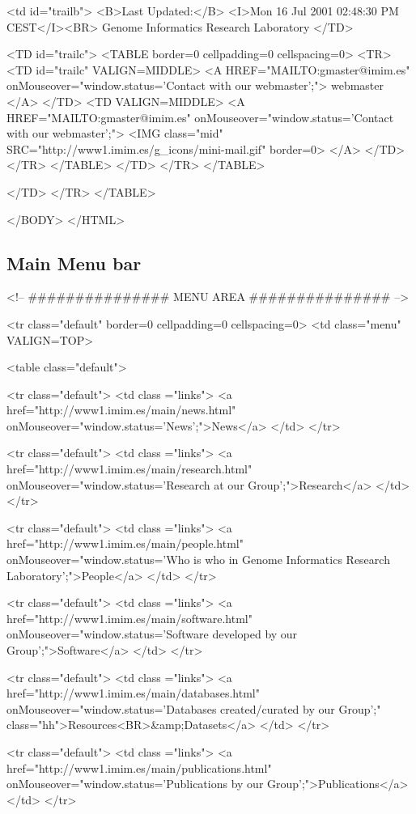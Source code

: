 \documentclass[11pt]{article}
\def\nwendcode{\endtrivlist \endgroup} %
\let\nwdocspar=\par                    %
\newcommand{\subsctn}[1]{\subsection{#1}}
\begin{document}
<td id="trailb">
<B>Last Updated:</B>  <I>Mon 16 Jul 2001 02:48:30 PM CEST</I><BR> Genome Informatics Research Laboratory
</TD>

<TD id="trailc">
<TABLE border=0 cellpadding=0 cellspacing=0>
<TR>
<TD id="trailc" VALIGN=MIDDLE>
<A HREF="MAILTO:gmaster@imim.es"
 onMouseover="window.status='Contact with our webmaster';">
 webmaster
</A>
</TD>
<TD VALIGN=MIDDLE>
<A HREF="MAILTO:gmaster@imim.es"
 onMouseover="window.status='Contact with our webmaster';">
<IMG class="mid" SRC="http://www1.imim.es/g_icons/mini-mail.gif" border=0>
</A>
</TD>
</TR>
</TABLE>
</TD>
</TR>
</TABLE>

</TD>
</TR>
</TABLE>

</BODY>
</HTML>
\nwendcode{}\nwdocspar

\subsctn{Main Menu bar}

\nwenddocs{}\endmoddef
<!-- ############### MENU AREA ############### -->

<tr class="default" border=0 cellpadding=0 cellspacing=0>
<td class="menu" VALIGN=TOP>

<table class="default">

<tr class="default">
<td class ="links">
 <a href="http://www1.imim.es/main/news.html"
  onMouseover="window.status='News';">News</a>
</td>
</tr>

<tr class="default">
<td class ="links">
 <a href="http://www1.imim.es/main/research.html"
  onMouseover="window.status='Research at our Group';">Research</a>
</td>
</tr>

<tr class="default">
<td class ="links">
 <a href="http://www1.imim.es/main/people.html"
  onMouseover="window.status='Who is who in Genome Informatics Research Laboratory';">People</a>
</td>
</tr>

<tr class="default">
<td class ="links">
 <a href="http://www1.imim.es/main/software.html"
  onMouseover="window.status='Software developed by our Group';">Software</a>
</td>
</tr>

<tr class="default">
<td class ="links">
 <a href="http://www1.imim.es/main/databases.html"
  onMouseover="window.status='Databases created/curated by our Group';" class="hh">Resources<BR>&amp;Datasets</a>
</td>
</tr>

<tr class="default">
<td class ="links">
 <a href="http://www1.imim.es/main/publications.html"
  onMouseover="window.status='Publications by our Group';">Publications</a>
</td>
</tr>
\end{document}
